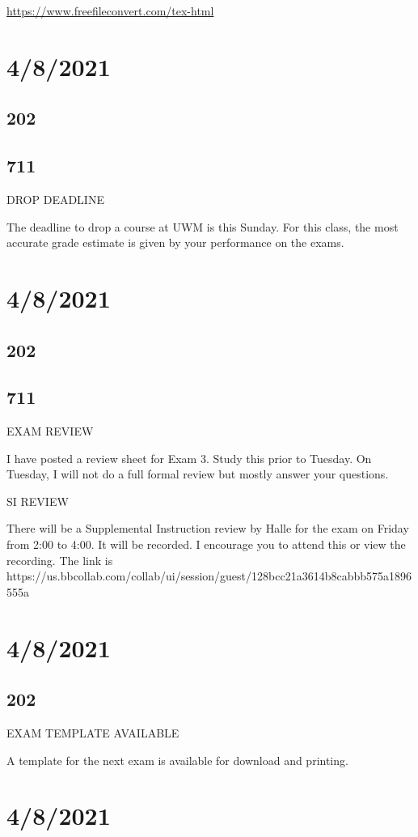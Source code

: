 \documentclass[]{article}
\begin{document}
	
\url{https://www.freefileconvert.com/tex-html}

\section*{4/8/2021}
\subsection*{202}
\subsection*{711}
DROP DEADLINE

The deadline to drop a course at UWM is this Sunday. For this class, the most accurate grade estimate is given by your performance on the exams.

\section*{4/8/2021}
\subsection*{202}
\subsection*{711}
EXAM REVIEW

I have posted a review sheet for Exam 3. Study this prior to Tuesday. On Tuesday, I will not do a full formal review but mostly answer your questions.

SI REVIEW

There will be a Supplemental Instruction review by Halle for the exam on Friday from 2:00 to 4:00. It will be recorded. I encourage you to attend this or view the recording. The link is https://us.bbcollab.com/collab/ui/session/guest/128bcc21a3614b8cabbb575a1896555a

\section*{4/8/2021}
\subsection*{202}
EXAM TEMPLATE AVAILABLE

A template for the next exam is available for download and printing.

\section*{4/8/2021}
\end{document}
